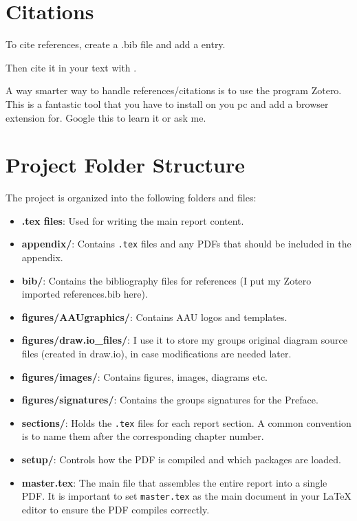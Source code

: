 \section*{Citations}

To cite references, create a .bib file and add a entry.

Then cite it in your text with \cite{lamport1994}. 


A way smarter way to handle references/citations is to use the program Zotero. This is a fantastic tool that you have to install on you pc and add a browser extension for. Google this to learn it or ask me.


\section*{Project Folder Structure}

The project is organized into the following folders and files:

\begin{itemize}
    \item \textbf{.tex files}: Used for writing the main report content.
    \item \textbf{appendix/}: Contains \texttt{.tex} files and any PDFs that should be included in the appendix.
    \item \textbf{bib/}: Contains the bibliography files for references (I put my Zotero imported references.bib here).
    \item \textbf{figures/AAUgraphics/}: Contains AAU logos and templates.
    \item \textbf{figures/draw.io\_files/}: I use it to store my groups original diagram source files (created in draw.io), in case modifications are needed later.
    \item \textbf{figures/images/}: Contains figures, images, diagrams etc.
    \item \textbf{figures/signatures/}: Contains the groups signatures for the Preface.
    \item \textbf{sections/}: Holds the \texttt{.tex} files for each report section. A common convention is to name them after the corresponding chapter number.
    \item \textbf{setup/}: Controls how the PDF is compiled and which packages are loaded.
    \item \textbf{master.tex}: The main file that assembles the entire report into a single PDF. 
    It is important to set \texttt{master.tex} as the main document in your LaTeX editor to ensure the PDF compiles correctly.
\end{itemize}

